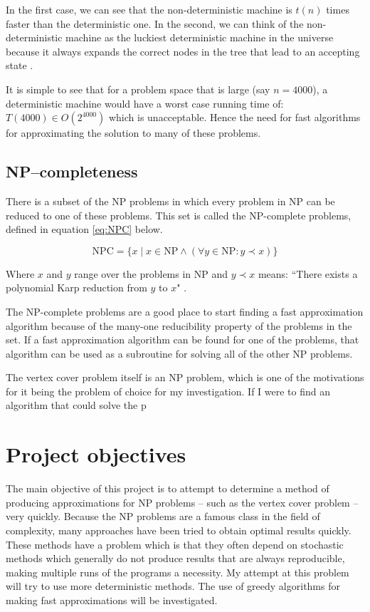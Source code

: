 \documentclass[11pt]{article}
\theoremstyle{definition}
\begin{document}
      In the first case, we can see that the non-deterministic machine is $t(n)$ times faster than the deterministic one.
      In the second, we can think of the non-deterministic machine as the luckiest deterministic machine in the
      universe because it always expands the correct nodes in the tree that lead to an accepting state \cite{Sipser:2005}.

      It is simple to see that for a problem space that is large (say $n=4000$), a deterministic machine would have a
      worst case running time of: $T(4000) \in O(2^{4000})$ which is unacceptable. Hence the need for fast algorithms
      for approximating the solution to many of these problems.  

      \subsection{NP--completeness} \label{NPC}
        There is a subset of the NP problems in which every problem in NP can be reduced to one of these problems. 
        This set is called the NP-complete problems, defined in equation \ref{eq:NPC} below.

        \begin{equation} \label{eq:NPC} 
          \text{NPC} = \{x\mid x \in \text{NP} \land (\forall y \in \text{NP}: y \prec x )\}  
        \end{equation}

        Where $x$ and $y$ range over the problems in NP and $y \prec x$ means: ``There exists a polynomial Karp reduction from $y$ to $x$" \cite{citeulike:Karp}\cite{citeulike:Cook}.

        The NP-complete problems are a good place to start finding a fast approximation algorithm because
        of the many-one reducibility property of the problems in the set. If a fast approximation algorithm can be found
        for one of the problems, that algorithm can be used as a subroutine for solving all of the other NP
        problems.

        The vertex cover problem itself is an NP problem, which is one of the motivations for it being the problem of
        choice for my investigation. If I were to find an algorithm that could solve the p

 
  \section{Project objectives}
    The main objective of this project is to attempt to determine a method of producing approximations for NP
    problems -- such as the vertex cover problem -- very quickly. Because the NP problems are a famous class
    in the field of complexity, many approaches have been
    tried to obtain optimal results quickly. These methods have a problem which is that they often
    depend on stochastic methods which generally do not produce results that are always reproducible,
    making multiple runs of the programs a necessity.
    My attempt at this problem will try to use more deterministic methods. The use of greedy algorithms for making
    fast approximations will be investigated.
\end{document}
